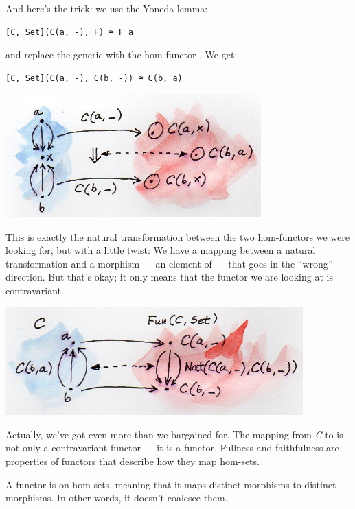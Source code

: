 And here's the trick: we use the Yoneda lemma:

\begin{Verbatim}[commandchars=\\\{\}]
[C, Set](C(a, -), F) ≅ F a
\end{Verbatim}

and replace the generic  with the hom-functor
. We get:

\begin{Verbatim}[commandchars=\\\{\}]
[C, Set](C(a, -), C(b, -)) ≅ C(b, a)
\end{Verbatim}

\includegraphics[width=3.87500in]{images/yoneda-embedding.jpg}

This is exactly the natural transformation between the two hom-functors
we were looking for, but with a little twist: We have a mapping between
a natural transformation and a morphism --- an element of
 --- that goes in the ``wrong'' direction. But that's
okay; it only means that the functor we are looking at is contravariant.

\includegraphics[width=4.51042in]{images/yoneda-embedding-2.jpg}

Actually, we've got even more than we bargained for. The mapping from
\emph{C} to \code{{[}C,\ Set{]}} is not only a contravariant functor
--- it is a  functor. Fullness and faithfulness are
properties of functors that describe how they map hom-sets.

A  functor is  on hom-sets, meaning that
it maps distinct morphisms to distinct morphisms. In other words, it
doesn't coalesce them.

